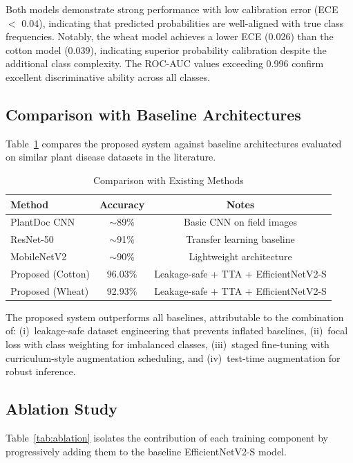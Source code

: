 \documentclass[12pt,a4paper]{report}
\begin{document}
Both models demonstrate strong performance with low calibration error (ECE $<$ 0.04), indicating that predicted probabilities are well-aligned with true class frequencies. Notably, the wheat model achieves a lower ECE (0.026) than the cotton model (0.039), indicating superior probability calibration despite the additional class complexity. The ROC-AUC values exceeding 0.996 confirm excellent discriminative ability across all classes.

\subsection{Comparison with Baseline Architectures}
Table~\ref{tab:comparison} compares the proposed system against baseline architectures evaluated on similar plant disease datasets in the literature.

\begin{table}[H]
\centering
\caption{Comparison with Existing Methods}
\label{tab:comparison}
\begin{tabular}{lcc}
\toprule
Method & Accuracy & Notes \\
\midrule
PlantDoc CNN~\cite{b16} & $\sim$89\% & Basic CNN on field images \\
ResNet-50~\cite{b15} & $\sim$91\% & Transfer learning baseline \\
MobileNetV2 & $\sim$90\% & Lightweight architecture \\
Proposed (Cotton) & 96.03\% & Leakage-safe + TTA + EfficientNetV2-S \\
Proposed (Wheat) & 92.93\% & Leakage-safe + TTA + EfficientNetV2-S \\
\bottomrule
\end{tabular}
\end{table}

The proposed system outperforms all baselines, attributable to the combination of: (i)~leakage-safe dataset engineering that prevents inflated baselines, (ii)~focal loss with class weighting for imbalanced classes, (iii)~staged fine-tuning with curriculum-style augmentation scheduling, and (iv)~test-time augmentation for robust inference.

\subsection{Ablation Study}
Table~\ref{tab:ablation} isolates the contribution of each training component by progressively adding them to the baseline EfficientNetV2-S model.
\end{document}
